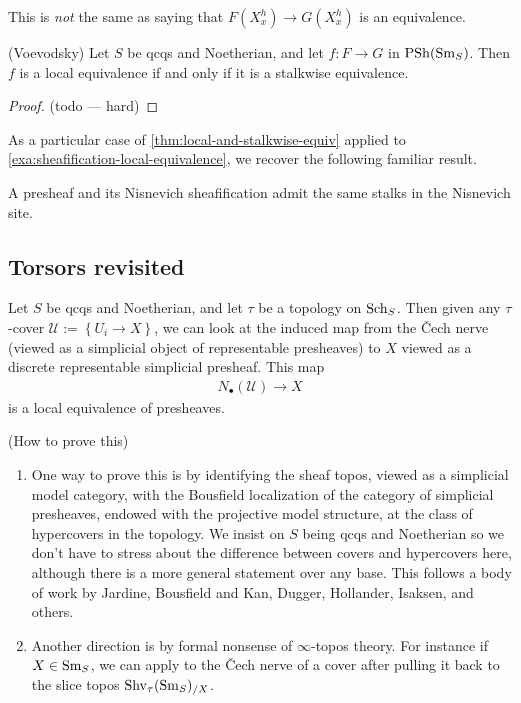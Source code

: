 \documentclass[11pt,openany]{book}
\renewcommand{\Pre}{\mathrm{PSh}}
\begin{document}
\begin{warning} This is \textit{not} the same as saying that $F(X_x^h) \to G(X_x^h)$ is an equivalence.
\end{warning}



\begin{theorem}\label{thm:local-and-stalkwise-equiv} 
(Voevodsky) Let $S$ be qcqs and Noetherian, and let $f \colon F \to G$ in $\Pre(\Sm_S)$. Then $f$ is a local equivalence if and only if it is a stalkwise equivalence.
\end{theorem}
\begin{proof} (todo --- hard)
\end{proof}

As a particular case of \autoref{thm:local-and-stalkwise-equiv} applied to \autoref{exa:sheafification-local-equivalence}, we recover the following familiar result.

\begin{corollary} A presheaf and its Nisnevich sheafification admit the same stalks in the Nisnevich site.
\end{corollary}



\subsection{Torsors revisited}

\begin{proposition} Let $S$ be qcqs and Noetherian, and let $\tau$ be a topology on $\mathrm{Sch}_S$. Then given any $\tau$-cover $\mathcal{U}:=\left\{ U_i \to X \right\}$, we can look at the induced map from the \v{C}ech nerve (viewed as a simplicial object of representable presheaves) to $X$ viewed as a discrete representable simplicial presheaf. This map
\begin{align*}
    N_\bullet(\mathcal{U}) \to X
\end{align*}
is a local equivalence of presheaves.
\end{proposition}

\begin{remark} (How to prove this)
\begin{enumerate}
    \item  One way to prove this is by identifying the sheaf topos, viewed as a simplicial model category, with the Bousfield localization of the category of simplicial presheaves, endowed with the projective model structure, at the class of hypercovers in the topology. We insist on $S$ being qcqs and Noetherian so we don't have to stress about the difference between covers and hypercovers here, although there is a more general statement over any base. This follows a body of work by Jardine, Bousfield and Kan, Dugger, Hollander, Isaksen, and others.
    \item Another direction is by formal nonsense of $\infty$-topos theory. For instance if $X\in \mathrm{Sm}_S$, we can apply \cite[A.5.3.1]{SAG} to the \v{C}ech nerve of a cover after pulling it back to the slice topos $\mathrm{Shv}_{\tau}(\mathrm{Sm}_S)_{/X}$.
\end{enumerate}

\end{remark}
\end{document}
